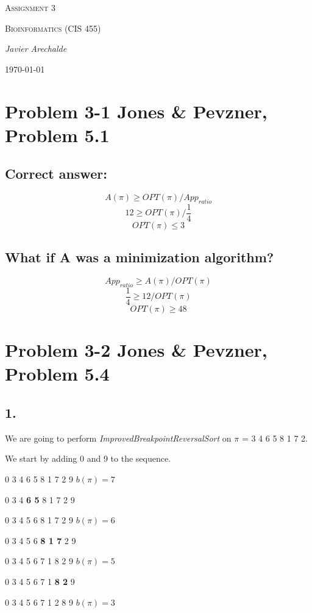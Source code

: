\documentclass{article}
\begin{document}
\begin{titlepage}
	\centering
	{\scshape\LARGE Assignment 3\par}
	\vspace{1cm}
	{\scshape\Large Bioinformatics (CIS 455)\par}
	\vspace{1.5cm}
	{\Large\itshape Javier Arechalde\par}
	\vfill
	{\large \today\par}
\end{titlepage}

\section*{Problem 3-1 Jones \& Pevzner, Problem 5.1}

\subsection*{Correct answer:}

$$A(\pi) \geq OPT(\pi)/App_{ratio}$$
$$12 \geq OPT(\pi)/\frac{1}{4}$$
$$OPT(\pi) \leq 3$$

\subsection*{What if A was a minimization algorithm?}

$$App_{ratio} \geq A(\pi)/OPT(\pi)$$
$$\frac{1}{4} \geq 12/OPT(\pi)$$
$$OPT(\pi) \geq 48$$

\section*{Problem 3-2 Jones \& Pevzner, Problem 5.4}

\subsection*{1.}

We are going to perform \textit{ImprovedBreakpointReversalSort} on $\pi$ = 3 4 6 5 8 1 7 2.

We start by adding 0 and 9 to the sequence.

\begin{center}
0 3 4 6 5 8 1 7 2 9 $b(\pi) = 7$

0 3 4 \textbf{6 5} 8 1 7 2 9

0 3 4 5 6 8 1 7 2 9 $b(\pi) = 6$

0 3 4 5 6 \textbf{8 1 7} 2 9

0 3 4 5 6 7 1 8 2 9 $b(\pi) = 5$

0 3 4 5 6 7 1 \textbf{8 2} 9

0 3 4 5 6 7 1 2 8 9 $b(\pi) = 3$
\end{center}
\end{document}
